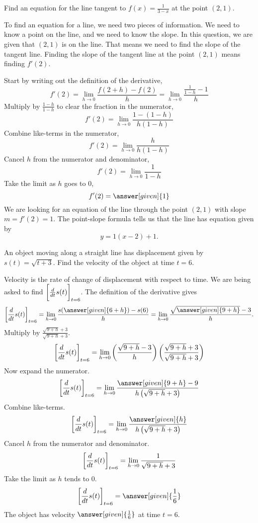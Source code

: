\documentclass{ximera}
\begin{document}
\begin{example}
  Find an equation for the line tangent to $f(x) = \frac{1}{3-x}$ at the point $(2, 1)$.
  \begin{explanation}
    To find an equation for a line, we need two pieces of information.  We need to know
    a point on the line, and we need to know the slope.  In this question, we are given
    that $(2,1)$ is on the line.  That means we need to find the slope of the tangent line.
    Finding the slope of the tangent line at the point $(2,1)$ means finding $f'(2)$.
    
    Start by writing out the definition of the derivative,
    \[
    f'(2) = \lim_{h\to 0} \frac{f(2+h)-f(2)}{h} = \lim_{h\to 0} \frac{\frac{1}{1-h} - 1}{h}
    \]
    Multiply by $\frac{1-h}{1-h}$ to clear the fraction in the numerator,
    \[
    f'(2) = \lim_{h\to 0} \frac{1 - (1-h)}{h(1-h)}
    \]
    Combine like-terms in the numerator,
    \[
    f'(2) = \lim_{h\to 0} \frac{h}{h(1-h)}
    \]
    Cancel $h$ from the numerator and denominator,
    \[
    f'(2) = \lim_{h\to 0} \frac{1}{1-h}
    \]		
    Take the limit as $h$ goes to $0$,
    \[
    f'(2) = \answer[given]{1}
    \]
    We are looking for an equation of the line through the point
    $(2,1)$ with slope $m = f'(2) = 1$.  The point-slope formula tells
    us that the line has equation given by
    \[
    y= 1(x-2) + 1.
    \]
  \end{explanation}
\end{example}

\begin{example}
  An object moving along a straight line has displacement given by
  $s(t) = \sqrt{t+3}$.  Find the velocity of the object at time $t=6$.
  \begin{explanation}
    Velocity is the rate of change of displacement with respect to
    time.  We are being asked to find $\bigg[ \frac{d }{d t} s(t) \bigg]_{t=6}$.  The
    definition of the derivative gives
    \[
    \eval{\dd{t} s(t)}_{t=6} = \lim_{h \to 0} \frac{s(\answer[given]{6+h})-s(6)}{h} = \lim_{h\to 0} \frac{\sqrt{\answer[given]{9+h}}-3}{h}.
    \]
    Multiply by $\frac{\sqrt{9+h}+3}{\sqrt{9+h}+3}$.
    \[
    \bigg[ \frac{d }{d t} s(t) \bigg]_{t=6} = \lim_{h\to 0} \left(\frac{\sqrt{9+h}-3}{h} \right)\left( \frac{\sqrt{9+h}+3}{\sqrt{9+h}+3} \right)
    \]		
    Now expand the numerator.		
    \[
    \eval{\dd{t} s(t)}_{t=6} = \lim_{h \to 0} \frac{\answer[given]{9+h} - 9}{h\left(\sqrt{9+h}+3 \right)}
    \]
    Combine like-terms.
    \[
    \eval{\dd{t} s(t)}_{t=6} = \lim_{h \to 0} \frac{\answer[given]{h}}{h\left(\sqrt{9+h}+3\right)}
    \]
    Cancel $h$ from the numerator and denominator.
    \[
    \bigg[ \frac{d }{d t} s(t) \bigg]_{t=6} = \lim_{h\to 0} \frac{1}{\sqrt{9+h}+3}
    \]
    Take the limit as $h$ tends to $0$.
    \[
    \eval{\dd{t} s(t)}_{t=6} = \answer[given]{\frac{1}{6}}
    \]
    The object has velocity $\answer[given]{\frac{1}{6}}$ at time $t=6$.
	\end{explanation}
\end{example}
\end{document}
